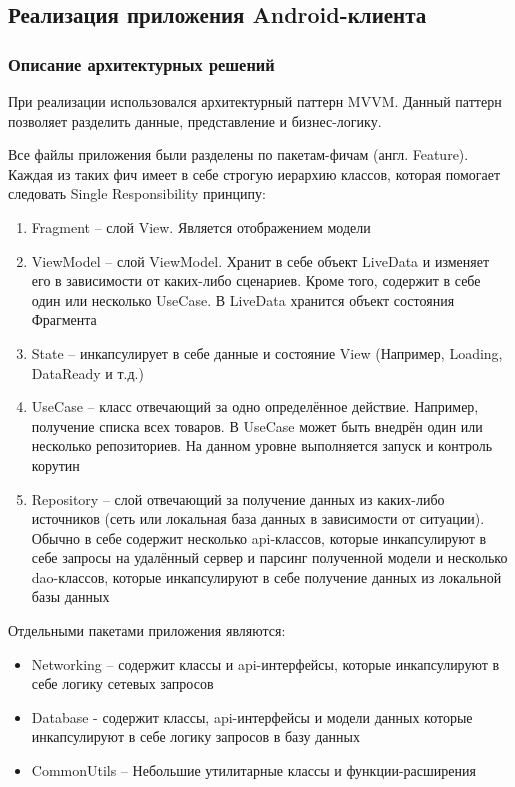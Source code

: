\subsection{Реализация приложения Android-клиента}\label{subsec:3-impl-android}\indent

\subsubsection{Описание архитектурных решений}\indent

При реализации использовался архитектурный паттерн MVVM. Данный паттерн позволяет разделить данные, представление и бизнес-логику.

Все файлы приложения были разделены по пакетам-фичам (англ. Feature).
Каждая из таких фич имеет в себе строгую иерархию классов, которая помогает следовать Single Responsibility принципу:
\begin{enumerate}
    \item Fragment – слой View.
    Является отображением модели
    \item ViewModel – слой ViewModel.
    Хранит в себе объект LiveData и изменяет его в зависимости от каких-либо сценариев.
    Кроме того, содержит в себе один или несколько UseCase.
    В LiveData хранится объект состояния Фрагмента
    \item State – инкапсулирует в себе данные и состояние View (Например, Loading, DataReady и т.д.)
    \item UseCase – класс отвечающий за одно определённое действие.
    Например, получение списка всех товаров.
    В UseCase может быть внедрён один или несколько репозиториев.
    На данном уровне выполняется запуск и контроль корутин
    \item Repository – слой отвечающий за получение данных из каких-либо источников (сеть или локальная база данных в зависимости от ситуации).
    Обычно в себе содержит несколько api-классов, которые инкапсулируют в себе запросы на удалённый сервер и парсинг полученной модели и несколько dao-классов, которые инкапсулируют в себе получение данных из локальной базы данных
\end{enumerate}

Отдельными пакетами приложения являются:
\begin{itemize}
    \item Networking – содержит классы и api-интерфейсы, которые инкапсулируют в себе логику сетевых запросов
    \item Database - содержит классы, api-интерфейсы и модели данных которые инкапсулируют в себе логику запросов в базу данных
    \item CommonUtils – Небольшие утилитарные классы и функции-расширения
\end{itemize}

